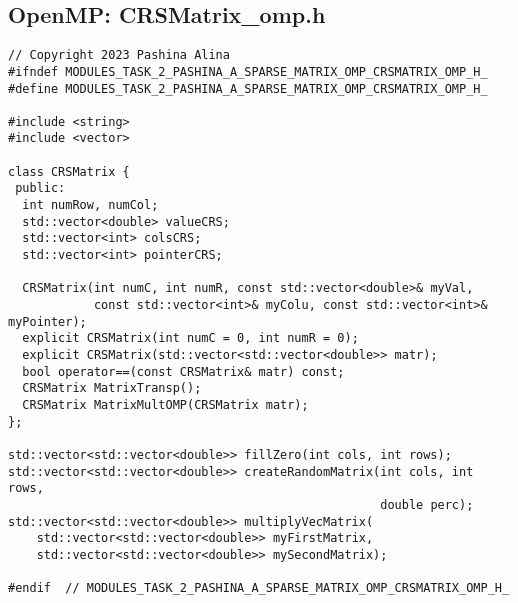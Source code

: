\documentclass[14pt, russian]{extarticle}
\begin{document}
	\subsection{OpenMP: CRSMatrix\_omp.h
}
	\begin{lstlisting}
// Copyright 2023 Pashina Alina
#ifndef MODULES_TASK_2_PASHINA_A_SPARSE_MATRIX_OMP_CRSMATRIX_OMP_H_
#define MODULES_TASK_2_PASHINA_A_SPARSE_MATRIX_OMP_CRSMATRIX_OMP_H_

#include <string>
#include <vector>

class CRSMatrix {
 public:
  int numRow, numCol;
  std::vector<double> valueCRS;
  std::vector<int> colsCRS;
  std::vector<int> pointerCRS;

  CRSMatrix(int numC, int numR, const std::vector<double>& myVal,
            const std::vector<int>& myColu, const std::vector<int>& myPointer);
  explicit CRSMatrix(int numC = 0, int numR = 0);
  explicit CRSMatrix(std::vector<std::vector<double>> matr);
  bool operator==(const CRSMatrix& matr) const;
  CRSMatrix MatrixTransp();
  CRSMatrix MatrixMultOMP(CRSMatrix matr);
};

std::vector<std::vector<double>> fillZero(int cols, int rows);
std::vector<std::vector<double>> createRandomMatrix(int cols, int rows,
                                                    double perc);
std::vector<std::vector<double>> multiplyVecMatrix(
    std::vector<std::vector<double>> myFirstMatrix,
    std::vector<std::vector<double>> mySecondMatrix);

#endif  // MODULES_TASK_2_PASHINA_A_SPARSE_MATRIX_OMP_CRSMATRIX_OMP_H_

	\end{lstlisting}
	\newpage
\end{document}
